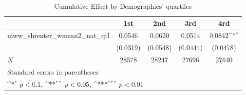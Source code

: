 \begin{table}[htbp]\centering
\def\sym#1{\ifmmode^{#1}\else\(^{#1}\)\fi}
\caption{Cumulative Effect by Demographics' quartiles}
\begin{tabular}{l*{4}{c}}
\hline\hline
            &\multicolumn{1}{c}{1st}&\multicolumn{1}{c}{2nd}&\multicolumn{1}{c}{3rd}&\multicolumn{1}{c}{4rd}\\
\hline
mww\_shrenter\_wmean2\_nat\_qtl&      0.0546         &      0.0620         &      0.0514         &      0.0842\sym{*}  \\
            &    (0.0319)         &    (0.0548)         &    (0.0444)         &    (0.0478)         \\
\hline
\(N\)       &       28578         &       28247         &       27696         &       27640         \\
\hline\hline
\multicolumn{5}{l}{\footnotesize Standard errors in parentheses}\\
\multicolumn{5}{l}{\footnotesize \sym{*} \(p<0.1\), \sym{**} \(p<0.05\), \sym{***} \(p<0.01\)}\\
\end{tabular}
\end{table}
